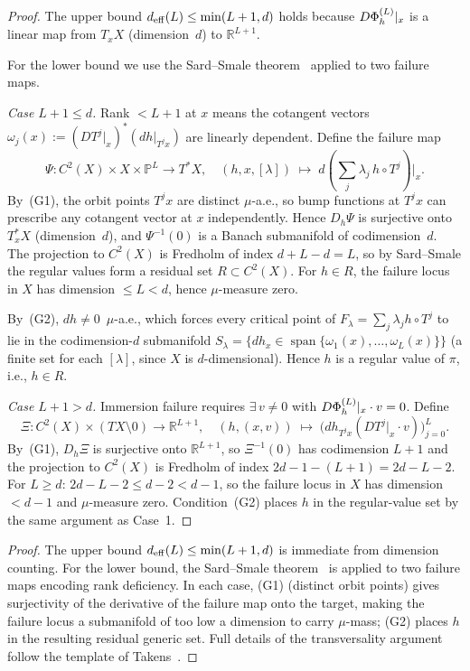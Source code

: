 \ifdraft
\begin{proof}
The upper bound $d_{\mathrm{eff}}(L) \leq \min(L+1,d)$ holds because $D\Phi_h^{(L)}|_x$ is a
linear map from $T_x X$ (dimension~$d$) to $\mathbb{R}^{L+1}$.

For the lower bound we use the Sard--Smale theorem~\cite{Smale1965}
applied to two failure maps.

\emph{Case $L+1 \leq d$.}
Rank $< L+1$ at $x$ means the cotangent vectors
$\omega_j(x) := (DT^j|_x)^*(dh|_{T^j x})$ are linearly dependent.
Define the failure map
\[
  \Psi : C^2(X) \times X \times \mathbb{P}^L \to T^*X,
  \quad
  (h, x, [\lambda]) \;\mapsto\; d\!\left(\textstyle\sum_j \lambda_j\, h \circ T^j\right)\bigl|_x.
\]
By~(G1), the orbit points $T^j x$ are distinct $\mu$-a.e., so bump functions
at $T^j x$ can prescribe any cotangent vector at $x$ independently.
Hence $D_h\Psi$ is surjective onto $T^*_x X$ (dimension~$d$), and
$\Psi^{-1}(0)$ is a Banach submanifold of codimension~$d$.
The projection to $C^2(X)$ is Fredholm of index $d + L - d = L$, so by
Sard--Smale the regular values form a residual set $R \subset C^2(X)$.
For $h \in R$, the failure locus in $X$ has dimension $\leq L < d$, hence
$\mu$-measure zero.

By~(G2), $dh \neq 0$~$\mu$-a.e., which forces every critical point of
$F_\lambda = \sum_j \lambda_j h \circ T^j$ to lie in the codimension-$d$
submanifold $S_\lambda = \{dh_x \in \operatorname{span}\{\omega_1(x),\ldots,\omega_L(x)\}\}$
(a finite set for each $[\lambda]$, since $X$ is $d$-dimensional).
Hence $h$ is a regular value of $\pi$, i.e., $h \in R$.

\emph{Case $L+1 > d$.}
Immersion failure requires $\exists\, v \neq 0$ with $D\Phi_h^{(L)}|_x \cdot v = 0$.
Define
\[
  \Xi : C^2(X) \times (TX \setminus 0) \to \mathbb{R}^{L+1},
  \quad
  (h,(x,v)) \;\mapsto\; \bigl(dh_{T^j x}(DT^j|_x \cdot v)\bigr)_{j=0}^L.
\]
By~(G1), $D_h\Xi$ is surjective onto $\mathbb{R}^{L+1}$, so $\Xi^{-1}(0)$
has codimension $L+1$ and the projection to $C^2(X)$ is Fredholm of index
$2d - 1 - (L+1) = 2d - L - 2$.
For $L \geq d$: $2d - L - 2 \leq d - 2 < d-1$, so the failure locus in $X$
has dimension $< d-1$ and $\mu$-measure zero.
Condition~(G2) places $h$ in the regular-value set by the same argument as
Case~1.
\end{proof}
\else
\begin{proof}
The upper bound $d_{\mathrm{eff}}(L) \leq \min(L+1,d)$ is immediate from dimension counting.
For the lower bound, the Sard--Smale theorem~\cite{Smale1965} is applied to two
failure maps encoding rank deficiency.
In each case, (G1) (distinct orbit points) gives surjectivity of the derivative
of the failure map onto the target, making the failure locus a submanifold of
too low a dimension to carry $\mu$-mass; (G2) places $h$ in the resulting
residual generic set.
Full details of the transversality argument follow the template of
Takens~\cite{Takens1981}.
\end{proof}
\fi


